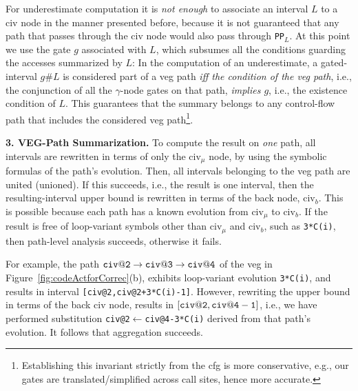 \documentclass[10pt,nocopyrightspace]{sigplanconf}
\begin{document}
For underestimate computation it is {\em not enough} to associate an interval $L$ 
to a {\sc civ} node in the manner presented before, because it is not guaranteed
that any path that passes through the {\sc civ} node would also pass through {\tt PP$_L$}.
%
%
At this point we use the gate $g$ associated with $L$, which subsumes all the
conditions guarding the accesses summarized by $L$: 
In the computation of an underestimate, a gated-interval $g\#L$ is considered 
part of a {\sc veg} path {\em iff the condition of the {\sc veg} path}, 
i.e., the conjunction of all the $\gamma$-node gates on that path, {\em implies $g$}, 
i.e., the existence condition of $L$.  This guarantees that the summary belongs
to any control-flow path that includes the considered {\sc veg} path\footnote{
Establishing this invariant strictly from the {\sc cfg} is more
conservative, e.g., our gates are translated/simplified across call sites,
hence more accurate.
}.

\vspace{1ex}

{\bf 3. VEG-Path Summarization.} 
%
To compute the result on {\em one} path, all intervals are rewritten in terms of only the
{\sc civ}$_\mu$ node, by using the symbolic formulas of the path's evolution.
Then, all intervals belonging to the {\sc veg} path are united (unioned). 
If this succeeds, i.e., the result is one interval, then the resulting-interval upper 
bound is rewritten in terms of the back node, {\sc civ}$_b$. This is possible because
each path has a known evolution from {\sc civ}$_\mu$ to {\sc civ}$_b$.  
If the result is free of loop-variant symbols other than {\sc civ}$_\mu$ and  {\sc civ}$_b$, 
such as {\tt 3*C(i)}, then path-level analysis succeeds, otherwise it fails.

For example, the path ${\tt civ@2}\rightarrow{\tt civ@3}\rightarrow{\tt civ@4}$ 
of the {\sc veg} in Figure~\ref{fig:codeActforCorrec}(b), exhibits loop-variant evolution 
{\tt 3*C(i)}, and results in interval {\tt [civ@2,civ@2+3*C(i)-1]}. 
%
However, rewriting the upper bound in terms of the back  
{\sc civ} node, results in $[{\tt civ@2},{\tt civ@4-1}]$, 
i.e., we have performed substitution {\tt civ@2$\leftarrow$civ@4-3*C(i)}
derived from that path's evolution.
It follows that aggregation succeeds.
%
\end{document}
